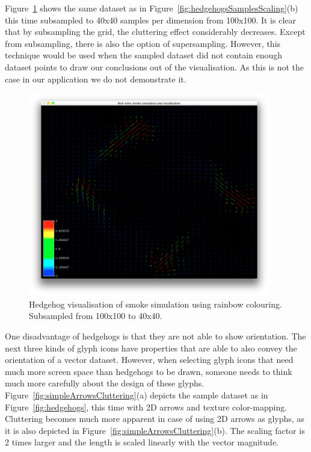 Figure~\ref{fig:hedgehogsSubsampled} shows the same dataset as in Figure~\ref{fig:hedgehogsSamplesScaling}(b) this time subsampled to 40x40 samples per dimension from 100x100. It is clear that by subsampling the grid, the cluttering effect considerably decreases. Except from subsampling, there is also the option of supersampling. However, this technique would be used when the sampled dataset did not contain enough dataset points to draw our conclusions out of the visualisation. As this is not the case in our application we do not demonstrate it.

\begin{figure}[htbp]
\begin{center}
\includegraphics[height=3.5in]{figures/glyph/hedgehogsSubsampled.png}
\caption{Hedgehog visualisation of smoke simulation using rainbow colouring. Subsampled from 100x100 to 40x40.}
\label{fig:hedgehogsSubsampled}
\end{center}
\end{figure}

One disadvantage of hedgehogs is that they are not able to show orientation. The next three kinds of glyph icons have properties that are able to also convey the orientation of a vector dataset. However, when selecting glyph icons that need much more screen space than hedgehogs to be drawn, someone needs to think much more carefully about the design of these glyphs. Figure~\ref{fig:simpleArrowsCluttering}(a) depicts the sample dataset as in Figure~\ref{fig:hedgehogs}, this time with 2D arrows and texture color-mapping. Cluttering becomes much more apparent in case of using 2D arrows as glyphs, as it is also depicted in Figure~\ref{fig:simpleArrowsCluttering}(b). The scaling factor is 2 times larger and the length is scaled linearly with the vector magnitude.

